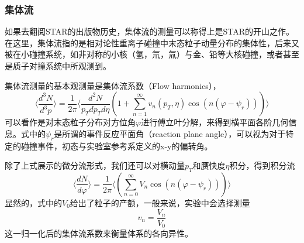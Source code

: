 \documentclass[%
 reprint,
 amsmath,amssymb,
 aps,
]{revtex4-1}
\begin{document}
\subsubsection{\label{sec:Flow}集体流}
如果去翻阅STAR的出版物历史，集体流的测量可以称得上是STAR的开山之作。在这里，集体流指的是相对论性重离子碰撞中末态粒子动量分布的集体性，后来又被在小碰撞系统，如非对称的小核（氢，氘，氚）与金、铅等大核碰撞，或者甚至是质子对撞系统中所观测到。

集体流测量的基本观测量是集体流系数（Flow harmonics），
\begin{equation}
    \langle \frac{d^3N}{d^3 p} \rangle = \frac{1}{2\pi} \langle \frac{d^2N}{p_Tdp_Td\eta} (1+\sum_{n=1}^\infty v_n(p_T,\eta)\cos(n(\varphi-\psi_r))) \rangle 
\end{equation}
可以看作是对末态粒子分布对方位角$\varphi$进行傅立叶分解，来得到横平面各阶几何信息。式中的$\psi_r$是所谓的事件反应平面角（reaction plane angle），可以视为对于特定的碰撞事件，初态与实验室参考系定义的x-y的偏转角。

除了上式展示的微分流形式，我们还可以对横动量$p_T$和赝快度$\eta$积分，得到积分流
\begin{equation}
    \langle \frac{dN}{d\varphi} \rangle = \frac{1}{2\pi} \langle (\sum_{n=0}^\infty V_n\cos(n(\varphi-\psi_r))) \rangle 
\end{equation}
显然的，式中的$V_0$给出了粒子的产额，一般来说，实验中会选择测量
\begin{equation}
    v_n = \frac{V_n}{V_0}
\end{equation}
这一归一化后的集体流系数来衡量体系的各向异性。
\end{document}
